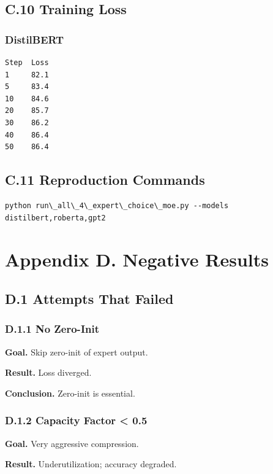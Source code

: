 \subsection{C.10 Training Loss}

\subsubsection{DistilBERT}
\begin{lstlisting}
Step  Loss
1     82.1
5     83.4
10    84.6
20    85.7
30    86.2
40    86.4
50    86.4
\end{lstlisting}

\subsection{C.11 Reproduction Commands}

\begin{lstlisting}
python run\_all\_4\_expert\_choice\_moe.py --models distilbert,roberta,gpt2
\end{lstlisting}



\section{Appendix D. Negative Results}

\subsection{D.1 Attempts That Failed}

\subsubsection{D.1.1 No Zero-Init}

\textbf{Goal.} Skip zero-init of expert output.

\textbf{Result.} Loss diverged.

\textbf{Conclusion.} Zero-init is essential.

\subsubsection{D.1.2 Capacity Factor \textless{} 0.5}

\textbf{Goal.} Very aggressive compression.

\textbf{Result.} Underutilization; accuracy degraded.

